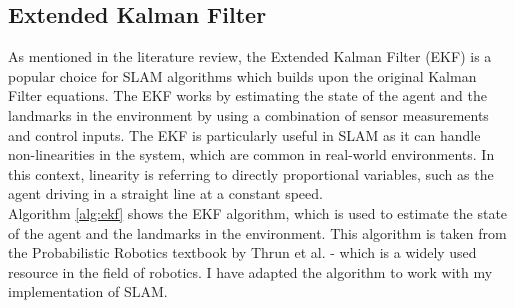 \documentclass[12pt]{article}
\begin{document}
\subsection{Extended Kalman Filter}
As mentioned in the literature review, the Extended Kalman Filter (EKF) is a popular choice for SLAM algorithms which builds upon the
original Kalman Filter equations. The EKF works by estimating the state of the agent and the landmarks in the environment by using
a combination of sensor measurements and control inputs. The EKF is particularly useful in SLAM as it can handle non-linearities in
the system, which are common in real-world environments. In this context, linearity is referring to directly proportional variables,
such as the agent driving in a straight line at a constant speed.\\
Algorithm \ref{alg:ekf} shows the EKF algorithm, which is used to estimate the state of the agent and the landmarks in the
environment. This algorithm is taken from the Probabilistic Robotics textbook by Thrun et al. \cite{EKF} - which is a widely used
resource in the field of robotics. I have adapted the algorithm to work with my implementation of SLAM.\\
\end{document}
